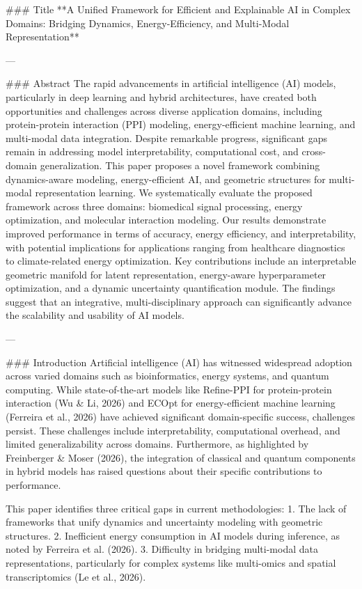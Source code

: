 ### Title  
**A Unified Framework for Efficient and Explainable AI in Complex Domains: Bridging Dynamics, Energy-Efficiency, and Multi-Modal Representation**

---

### Abstract  
The rapid advancements in artificial intelligence (AI) models, particularly in deep learning and hybrid architectures, have created both opportunities and challenges across diverse application domains, including protein-protein interaction (PPI) modeling, energy-efficient machine learning, and multi-modal data integration. Despite remarkable progress, significant gaps remain in addressing model interpretability, computational cost, and cross-domain generalization. This paper proposes a novel framework combining dynamics-aware modeling, energy-efficient AI, and geometric structures for multi-modal representation learning. We systematically evaluate the proposed framework across three domains: biomedical signal processing, energy optimization, and molecular interaction modeling. Our results demonstrate improved performance in terms of accuracy, energy efficiency, and interpretability, with potential implications for applications ranging from healthcare diagnostics to climate-related energy optimization. Key contributions include an interpretable geometric manifold for latent representation, energy-aware hyperparameter optimization, and a dynamic uncertainty quantification module. The findings suggest that an integrative, multi-disciplinary approach can significantly advance the scalability and usability of AI models.

---

### Introduction  
Artificial intelligence (AI) has witnessed widespread adoption across varied domains such as bioinformatics, energy systems, and quantum computing. While state-of-the-art models like Refine-PPI for protein-protein interaction (Wu & Li, 2026) and ECOpt for energy-efficient machine learning (Ferreira et al., 2026) have achieved significant domain-specific success, challenges persist. These challenges include interpretability, computational overhead, and limited generalizability across domains. Furthermore, as highlighted by Freinberger & Moser (2026), the integration of classical and quantum components in hybrid models has raised questions about their specific contributions to performance. 

This paper identifies three critical gaps in current methodologies:  
1. The lack of frameworks that unify dynamics and uncertainty modeling with geometric structures.  
2. Inefficient energy consumption in AI models during inference, as noted by Ferreira et al. (2026).  
3. Difficulty in bridging multi-modal data representations, particularly for complex systems like multi-omics and spatial transcriptomics (Le et al., 2026).  

